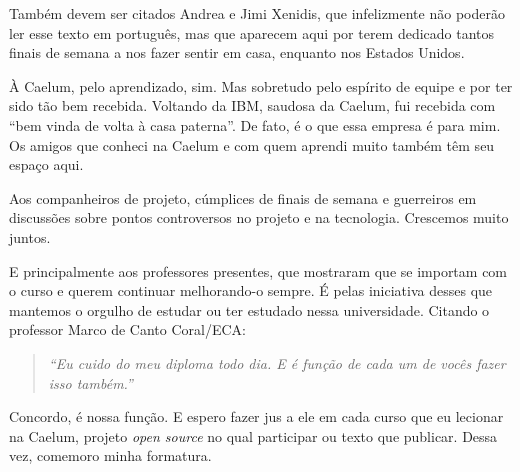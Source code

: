 \documentclass[titlepage,a4paper]{article}
\newcommand{\opensource}{\textit{open source}}
\begin{document}
Também devem ser citados Andrea e Jimi Xenidis, que infelizmente não poderão ler esse texto em português, mas que aparecem aqui por terem dedicado tantos finais de semana a nos fazer sentir em casa, enquanto nos Estados Unidos.

À Caelum, pelo aprendizado, sim. Mas sobretudo pelo espírito de equipe e por ter sido tão bem recebida. Voltando da IBM, saudosa da Caelum, fui recebida com ``bem vinda de volta à casa paterna''. De fato, é o que essa empresa é para mim. Os amigos que conheci na Caelum e com quem aprendi muito também têm seu espaço aqui.

Aos companheiros de projeto, cúmplices de finais de semana e guerreiros em discussões sobre pontos controversos no projeto e na tecnologia. Crescemos muito juntos.

E principalmente aos professores presentes, que mostraram que se importam com o curso e querem continuar melhorando-o sempre. É pelas iniciativa desses que mantemos o orgulho de estudar ou ter estudado nessa universidade. Citando o professor Marco de Canto Coral/ECA:

\begin{quote}
	\textit{``Eu cuido do meu diploma todo dia. E é função de cada um de vocês fazer isso também.''}
\end{quote}

Concordo, é nossa função. E espero fazer jus a ele em cada curso que eu lecionar na Caelum, projeto \opensource{} no qual participar ou texto que publicar. Dessa vez, comemoro minha formatura.
\end{document}
